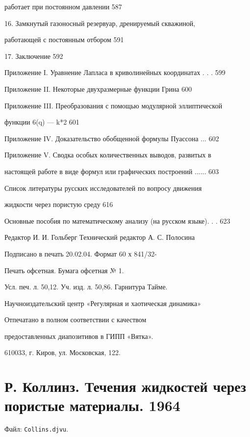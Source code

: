 \documentclass[
  11pt,
]{article}
\begin{document}
работает при постоянном давлении 587 \par
16. Замкнутый газоносный резервуар, дренируемый скважиной,  \par
работающей с постоянным отбором 591 \par
17. Заключение 592 \par
Приложение I. Уравнение Лапласа в криволинейных координатах . . . 599 \par
Приложение II. Некоторые двухразмерные функции Грина 600 \par
Приложение III. Преобразования с помощью модулярной эллиптической \par
функции 6(q) --- k*2 601 \par
Приложение IV. Доказательство обобщенной формулы Пуассона ... 602 \par
Приложение V. Сводка особых количественных выводов, развитых в  \par
настоящей работе в виде формул или графических построений ...... 603 \par
Список литературы русских исследователей по вопросу движения  \par
жидкости через пористую среду 616 \par
Основные пособия по математическому анализу (на русском языке). . . 623 \par
Редактор И. И. Гольберг Технический редактор А. С. Полосина \par
Подписано в печать 20.02.04. Формат 60 х 841/32- \par
Печать офсетная. Бумага офсетная № 1. \par
Усл. печ. л. 50,12. Уч. изд. л. 50,86. Гарнитура Тайме. \par
Научноиздательский центр «Регулярная и хаотическая динамика» \par
Отпечатано в полном соответствии с качеством \par
предоставленных диапозитивов в ГИПП «Вятка». \par
610033, г. Киров, ул. Московская, 122.\par
\endgroup


\section{Р. Коллинз. Течения жидкостей через пористые материалы. 1964}\label{section-12}

Файл: \texttt{Collins.djvu}.
\end{document}
